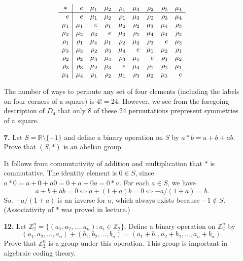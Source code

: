 \documentclass[12pt,reqno]{amsart}
\newcommand{\<}{\ensuremath{\langle}}
\renewcommand{\>}{\ensuremath{\rangle}}
\begin{document}
\begin{enumerate}
\[
\begin{array}{r|*{8}{r}}
\multicolumn{1}{c|}{\ast}&e&\mu_1&\mu_2&\rho_1&\mu_3&\rho_2&\rho_3&\mu_4\\\hline
{}e&e&\mu_1&\mu_2&\rho_1&\mu_3&\rho_2&\rho_3&\mu_4\\
{}\mu_1&\mu_1&e&\rho_1&\mu_2&\rho_2&\mu_3&\mu_4&\rho_3\\
{}\mu_2&\mu_2&\rho_3&e&\mu_3&\rho_1&\mu_4&\mu_1&\rho_2\\
{}\rho_1&\rho_1&\mu_4&\mu_1&\rho_2&\mu_2&\rho_3&e&\mu_3\\
{}\mu_3&\mu_3&\rho_2&\rho_3&\mu_4&e&\mu_1&\mu_2&\rho_1\\
{}\rho_2&\rho_2&\mu_3&\mu_4&\rho_3&\mu_1&e&\rho_1&\mu_2\\
{}\rho_3&\rho_3&\mu_2&\mu_3&e&\mu_4&\rho_1&\rho_2&\mu_1\\
{}\mu_4&\mu_4&\rho_1&\rho_2&\mu_1&\rho_3&\mu_2&\mu_3&e\\
\end{array}
\]

\medskip

The number of ways to permute any set of four elements (including the labels on
four corners of a square) is $4! = 24$. However, we see from the foregoing
description of $D_4$ that only 8 of these 24 permutations prepresent symmetries
of a square.


\newpage

\item[{\bf 7.}]
Let $S = {\mathbb R} \setminus \{ -1 \}$ and define a binary operation on
$S$ by $a \ast b = a + b +ab$. Prove that $(S, \ast)$ is an abelian
group.
 

\medskip

It follows from commutativity of addition and multiplication that $*$ is
commutative.
The identity element is $0\in S$, since $a*0 = a+0+ a0 = 0+a+ 0a =0*a$.
For each $a\in S$, we have 
\[
a + b + ab = 0 \Leftrightarrow a + (1+a)b = 0
\Leftrightarrow -a/(1+a)= b.
\]
So, $-a/(1+a)$ is an inverse for $a$, which always exists because $-1\notin S$.
(Associativity of $*$ was proved in lecture.)

\medskip

\item[{\bf 12.}]
Let ${\mathbb Z}_2^n = \{ (a_1, a_2, \ldots, a_n) : a_i \in {\mathbb Z}_2
\}$. Define a binary operation on ${\mathbb Z}_2^n$ by
\[
(a_1, a_2, \ldots, a_n)
+
(b_1, b_2, \ldots, b_n)
=
(a_1+b_1, a_2+b_2, \ldots, a_n+b_n).
\]
Prove that ${\mathbb Z}_2^n$ is a group under this operation. This group
is important in algebraic coding theory. 
 

\end{enumerate}
\end{document}
